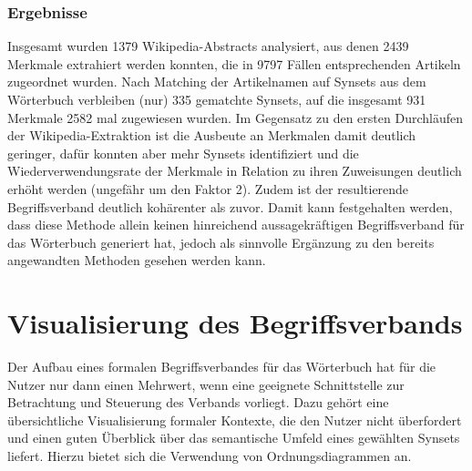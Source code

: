 \documentclass[pagesize,paper=A4,DIV=calc,fontsize=12pt,draft=false]{scrreprt}
\begin{document}
\subsubsection{Ergebnisse}

Insgesamt wurden 1379 Wikipedia-Abstracts analysiert, aus denen 2439 Merkmale extrahiert werden konnten, die in 9797 Fällen entsprechenden Artikeln zugeordnet wurden. 
Nach Matching der Artikelnamen auf Synsets aus dem Wörterbuch verbleiben (nur) 335 gematchte Synsets, auf die insgesamt 931 Merkmale 2582 mal zugewiesen wurden. 
Im Gegensatz zu den ersten Durchläufen der Wikipedia-Extraktion ist die Ausbeute an Merkmalen damit deutlich geringer, dafür konnten aber mehr Synsets identifiziert und die Wiederverwendungsrate der Merkmale in Relation zu ihren Zuweisungen deutlich erhöht werden (ungefähr um den Faktor 2). 
Zudem ist der resultierende Begriffsverband deutlich kohärenter als zuvor. 
Damit kann festgehalten werden, dass diese Methode allein keinen hinreichend aussagekräftigen Begriffsverband für das Wörterbuch generiert hat, jedoch als sinnvolle Ergänzung zu den bereits angewandten Methoden gesehen werden kann. 

\section{Visualisierung des Begriffsverbands}

Der Aufbau eines formalen Begriffsverbandes für das Wörterbuch hat für die Nutzer nur dann einen Mehrwert, wenn eine geeignete Schnittstelle zur Betrachtung und Steuerung des Verbands vorliegt. 
Dazu gehört eine übersichtliche Visualisierung formaler Kontexte, die den Nutzer nicht überfordert und einen guten Überblick über das semantische Umfeld eines gewählten Synsets liefert.
Hierzu bietet sich die Verwendung von Ordnungsdiagrammen an. 
\end{document}
